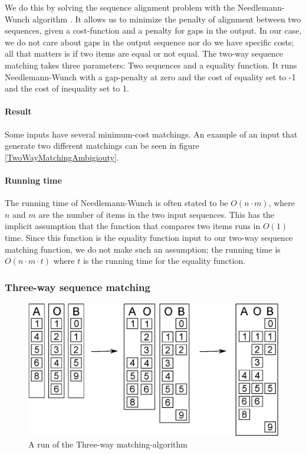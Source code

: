 \documentclass[11pt]{article}
\begin{document}
We do this by solving the sequence alignment problem with the Needlemann-Wunch algorithm . It allows us to minimize the penalty of alignment between two sequences, given a cost-function and a penalty for gaps in the output. In our case, we do not care about gaps in the output sequence nor do we have specific costs; all that matters is if two items are equal or not equal. The two-way sequence matching takes three parameters: Two sequences and a equality function. It runs Needlemann-Wunch with a gap-penalty at zero and the cost of equality set to -1 and the cost of inequality set to 1.

\paragraph{Result} Some inputs have several minimum-cost matchings. An example of an input that generate two different matchings can be seen in figure \ref{TwoWayMatchingAmbigiouty}.

\paragraph{Running time} The running time of Needlemann-Wunch is often stated to be $O(n \cdot m)$, where $n$ and $m$ are the number of items in the two input sequences. This has the implicit assumption that the function that compares two items runs in $O(1)$ time. Since this function is the equality function input to our two-way sequence matching function, we do not make such an assumption; the running time is $O(n \cdot m \cdot t)$ where $t$ is the running time for the equality function.

\subsubsection{Three-way sequence matching}
\begin{figure}
   \centerline{\includegraphics[scale=0.6]{drawings/eps/threewaymatching.eps}}
   \caption{A run of the Three-way matching-algorithm}
   \label{ThreewayMatching}
\end{figure}
\end{document}
